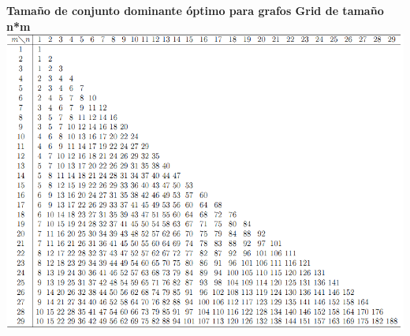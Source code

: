 \begin {center}
\textbf{Tamaño de conjunto dominante óptimo para grafos Grid de tamaño n*m}
\includegraphics[width=18cm]{./graficos/cd_grid_exacto.png}
\end {center} 

